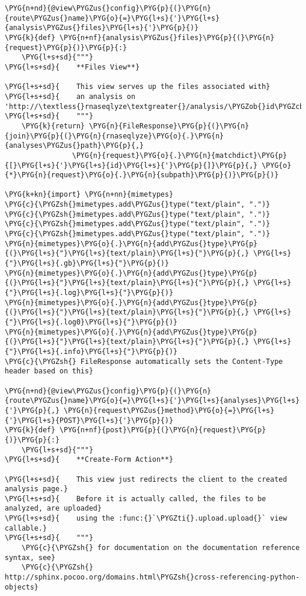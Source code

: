 \begin{Verbatim}[commandchars=\\\{\}]
\PYG{n+nd}{@view\PYGZus{}config}\PYG{p}{(}\PYG{n}{route\PYGZus{}name}\PYG{o}{=}\PYG{l+s}{'}\PYG{l+s}{analysis\PYGZus{}files}\PYG{l+s}{'}\PYG{p}{)}
\PYG{k}{def} \PYG{n+nf}{analysis\PYGZus{}files}\PYG{p}{(}\PYG{n}{request}\PYG{p}{)}\PYG{p}{:}
    \PYG{l+s+sd}{"""}
\PYG{l+s+sd}{    **Files View**}

\PYG{l+s+sd}{    This view serves up the files associated with}
\PYG{l+s+sd}{    an analysis on 'http://\textless{}rnaseqlyze\textgreater{}/analysis/\PYGZob{}id\PYGZcb{}/files'.}
\PYG{l+s+sd}{    """}
    \PYG{k}{return} \PYG{n}{FileResponse}\PYG{p}{(}\PYG{n}{join}\PYG{p}{(}\PYG{n}{rnaseqlyze}\PYG{o}{.}\PYG{n}{analyses\PYGZus{}path}\PYG{p}{,}
                \PYG{n}{request}\PYG{o}{.}\PYG{n}{matchdict}\PYG{p}{[}\PYG{l+s}{'}\PYG{l+s}{id}\PYG{l+s}{'}\PYG{p}{]}\PYG{p}{,} \PYG{o}{*}\PYG{n}{request}\PYG{o}{.}\PYG{n}{subpath}\PYG{p}{)}\PYG{p}{)}

\PYG{k+kn}{import} \PYG{n+nn}{mimetypes}
\PYG{c}{\PYGZsh{}mimetypes.add\PYGZus{}type("text/plain", ".")}
\PYG{c}{\PYGZsh{}mimetypes.add\PYGZus{}type("text/plain", ".")}
\PYG{c}{\PYGZsh{}mimetypes.add\PYGZus{}type("text/plain", ".")}
\PYG{c}{\PYGZsh{}mimetypes.add\PYGZus{}type("text/plain", ".")}
\PYG{n}{mimetypes}\PYG{o}{.}\PYG{n}{add\PYGZus{}type}\PYG{p}{(}\PYG{l+s}{"}\PYG{l+s}{text/plain}\PYG{l+s}{"}\PYG{p}{,} \PYG{l+s}{"}\PYG{l+s}{.gb}\PYG{l+s}{"}\PYG{p}{)}
\PYG{n}{mimetypes}\PYG{o}{.}\PYG{n}{add\PYGZus{}type}\PYG{p}{(}\PYG{l+s}{"}\PYG{l+s}{text/plain}\PYG{l+s}{"}\PYG{p}{,} \PYG{l+s}{"}\PYG{l+s}{.log}\PYG{l+s}{"}\PYG{p}{)}
\PYG{n}{mimetypes}\PYG{o}{.}\PYG{n}{add\PYGZus{}type}\PYG{p}{(}\PYG{l+s}{"}\PYG{l+s}{text/plain}\PYG{l+s}{"}\PYG{p}{,} \PYG{l+s}{"}\PYG{l+s}{.log0}\PYG{l+s}{"}\PYG{p}{)}
\PYG{n}{mimetypes}\PYG{o}{.}\PYG{n}{add\PYGZus{}type}\PYG{p}{(}\PYG{l+s}{"}\PYG{l+s}{text/plain}\PYG{l+s}{"}\PYG{p}{,} \PYG{l+s}{"}\PYG{l+s}{.info}\PYG{l+s}{"}\PYG{p}{)}
\PYG{c}{\PYGZsh{} FileResponse automatically sets the Content-Type header based on this}

\PYG{n+nd}{@view\PYGZus{}config}\PYG{p}{(}\PYG{n}{route\PYGZus{}name}\PYG{o}{=}\PYG{l+s}{'}\PYG{l+s}{analyses}\PYG{l+s}{'}\PYG{p}{,} \PYG{n}{request\PYGZus{}method}\PYG{o}{=}\PYG{l+s}{'}\PYG{l+s}{POST}\PYG{l+s}{'}\PYG{p}{)}
\PYG{k}{def} \PYG{n+nf}{post}\PYG{p}{(}\PYG{n}{request}\PYG{p}{)}\PYG{p}{:}
    \PYG{l+s+sd}{"""}
\PYG{l+s+sd}{    **Create-Form Action**}

\PYG{l+s+sd}{    This view just redirects the client to the created analysis page.}
\PYG{l+s+sd}{    Before it is actually called, the files to be analyzed, are uploaded}
\PYG{l+s+sd}{    using the :func:{}`\PYGZti{}.upload.upload{}` view callable.}
\PYG{l+s+sd}{    """}
    \PYG{c}{\PYGZsh{} for documentation on the documentation reference syntax, see}
    \PYG{c}{\PYGZsh{} http://sphinx.pocoo.org/domains.html\PYGZsh{}cross-referencing-python-objects}


\end{Verbatim}
